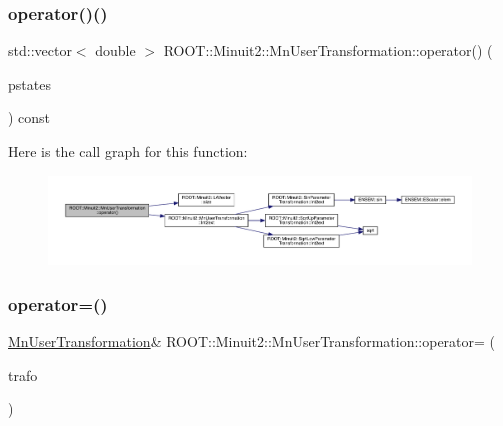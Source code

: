 \subsubsection{\texorpdfstring{operator()()}{operator()()}\hspace{0.1cm}{\footnotesize\ttfamily [2/2]}}
{\footnotesize\ttfamily std\+::vector$<$ double $>$ R\+O\+O\+T\+::\+Minuit2\+::\+Mn\+User\+Transformation\+::operator() (\begin{DoxyParamCaption}\item[{const \mbox{\hyperlink{namespaceROOT_1_1Minuit2_a62ed97730a1ca8d3fbaec64a19aa11c9}{Mn\+Algebraic\+Vector}} \&}]{pstates }\end{DoxyParamCaption}) const}

Here is the call graph for this function\+:\nopagebreak
\begin{figure}[H]
\begin{center}
\leavevmode
\includegraphics[width=350pt]{d9/d98/classROOT_1_1Minuit2_1_1MnUserTransformation_a5b4f45e11a5497d548e4b3e9dec95c6d_cgraph}
\end{center}
\end{figure}
\mbox{\label{classROOT_1_1Minuit2_1_1MnUserTransformation_a54aa66bb6edb8264484b6ece788b903c}} 
\subsubsection{\texorpdfstring{operator=()}{operator=()}\hspace{0.1cm}{\footnotesize\ttfamily [1/2]}}
{\footnotesize\ttfamily \mbox{\hyperlink{classROOT_1_1Minuit2_1_1MnUserTransformation}{Mn\+User\+Transformation}}\& R\+O\+O\+T\+::\+Minuit2\+::\+Mn\+User\+Transformation\+::operator= (\begin{DoxyParamCaption}\item[{const \mbox{\hyperlink{classROOT_1_1Minuit2_1_1MnUserTransformation}{Mn\+User\+Transformation}} \&}]{trafo }\end{DoxyParamCaption})\hspace{0.3cm}{\ttfamily [inline]}}

